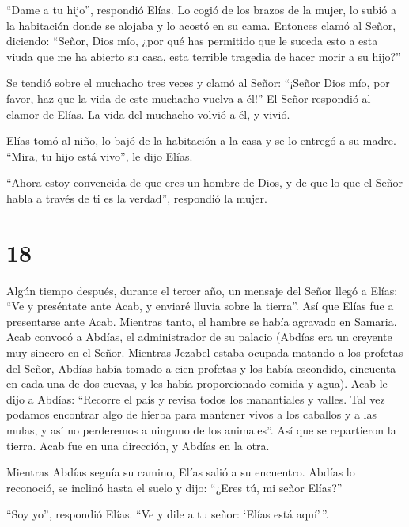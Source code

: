  ``Dame a tu hijo'', respondió Elías. Lo cogió de los
brazos de la mujer, lo subió a la habitación donde se alojaba y lo
acostó en su cama.  Entonces clamó al Señor, diciendo:
``Señor, Dios mío, ¿por qué has permitido que le suceda esto a esta
viuda que me ha abierto su casa, esta terrible tragedia de hacer morir a
su hijo?''

 Se tendió sobre el muchacho tres veces y clamó al Señor:
``¡Señor Dios mío, por favor, haz que la vida de este muchacho vuelva a
él!''  El Señor respondió al clamor de Elías. La vida del
muchacho volvió a él, y vivió.

 Elías tomó al niño, lo bajó de la habitación a la casa y
se lo entregó a su madre. ``Mira, tu hijo está vivo'', le dijo Elías.

 ``Ahora estoy convencida de que eres un hombre de Dios, y
de que lo que el Señor habla a través de ti es la verdad'', respondió la
mujer.

\hypertarget{section-17}{%
\section{18}\label{section-17}}

 Algún tiempo después, durante el tercer año, un mensaje del
Señor llegó a Elías: ``Ve y preséntate ante Acab, y enviaré lluvia sobre
la tierra''.  Así que Elías fue a presentarse ante Acab.
Mientras tanto, el hambre se había agravado en Samaria. 
Acab convocó a Abdías, el administrador de su palacio (Abdías era un
creyente muy sincero en el Señor.  Mientras Jezabel estaba
ocupada matando a los profetas del Señor, Abdías había tomado a cien
profetas y los había escondido, cincuenta en cada una de dos cuevas, y
les había proporcionado comida y agua).  Acab le dijo a
Abdías: ``Recorre el país y revisa todos los manantiales y valles. Tal
vez podamos encontrar algo de hierba para mantener vivos a los caballos
y a las mulas, y así no perderemos a ninguno de los animales''.
 Así que se repartieron la tierra. Acab fue en una
dirección, y Abdías en la otra.

 Mientras Abdías seguía su camino, Elías salió a su
encuentro. Abdías lo reconoció, se inclinó hasta el suelo y dijo:
``¿Eres tú, mi señor Elías?''

 ``Soy yo'', respondió Elías. ``Ve y dile a tu señor: `Elías
está aquí'\,''.

